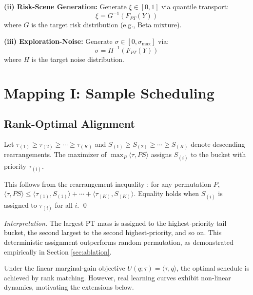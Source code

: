 \documentclass[11pt, a4paper, oneside]{article}
\theoremstyle{plain}
\theoremstyle{break}
\theoremstyle{plain}
\theoremstyle{breakdef}
\theoremstyle{plain}
\theoremstyle{breakrem}
\theoremstyle{plain}
\theoremstyle{breakrem}
\renewenvironment{Proof}{\par\noindent{\bfseries Proof.}}{\qed\par}
\begin{document}
\textbf{(ii) Risk-Scene Generation:} Generate $\xi \in [0,1]$ via quantile transport:
\begin{equation}
\xi = G^{-1}(F_{PT}(Y))
\label{eq:risk}
\end{equation}
where $G$ is the target risk distribution (e.g., Beta mixture).

\textbf{(iii) Exploration-Noise:} Generate $\sigma \in [0, \sigma_{\max}]$ via:
\begin{equation}
\sigma = H^{-1}(F_{PT}(Y))
\label{eq:noise}
\end{equation}
where $H$ is the target noise distribution.

\section{Mapping I: Sample Scheduling}
\label{sec:mapping1}

\subsection{Rank-Optimal Alignment}

\begin{ theorem}
Let $\tau_{(1)} \geq \tau_{(2)} \geq \cdots \geq \tau_{(K)}$ and $S_{(1)} \geq S_{(2)} \geq \cdots \geq S_{(K)}$ denote descending rearrangements. The maximizer of $\max_P \langle \tau, P S \rangle$ assigns $S_{(i)}$ to the bucket with priority $\tau_{(i)}$.
\end{ theorem}

\begin{Proof}
This follows from the rearrangement inequality \cite{villani2008optimal}: for any permutation $P$, $\langle \tau, P S \rangle \leq \langle \tau_{(1)}, S_{(1)} \rangle + \cdots + \langle \tau_{(K)}, S_{(K)} \rangle$. Equality holds when $S_{(i)}$ is assigned to $\tau_{(i)}$ for all $i$.
\end{Proof}

\textit{Interpretation.} The largest PT mass is assigned to the highest-priority tail bucket, the second largest to the second highest-priority, and so on. This deterministic assignment outperforms random permutation, as demonstrated empirically in Section \ref{sec:ablation}.

Under the linear marginal-gain objective $U(q; \tau) = \langle \tau, q \rangle$, the optimal schedule is achieved by rank matching. However, real learning curves exhibit non-linear dynamics, motivating the extensions below.
\end{document}
